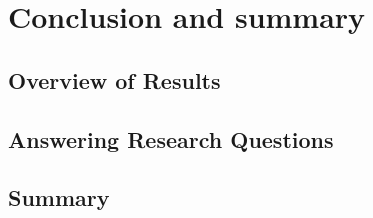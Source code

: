 \chapter{Conclusion and summary} \label{conclusion}

\section{Overview of Results} \label{overview}

\section{Answering Research Questions} \label{RQ answers}

\section{Summary} \label{summary}
